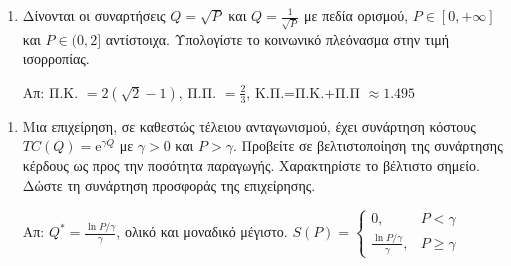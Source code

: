 \begin{center}
  \minibox{\large\bfseries \textcolor{Col1}{Πλεόνασμα Παραγωγού - Καταναλωτή}}
\end{center}

\begin{enumerate}
  \item Δίνονται οι συναρτήσεις $ Q = \sqrt{P} $ και $ Q = \frac{1}{\sqrt{P}} $ 
    με πεδία ορισμού, $ P \in [0, + \infty] $ και $ P \in (0,2] $ αντίστοιχα. 
    Υπολογίστε το κοινωνικό πλεόνασμα στην τιμή ισορροπίας.

    \hfill Απ: Π.Κ. $= 2(\sqrt{2} -1)$, Π.Π. $= \frac{2}{3} $, Κ.Π.=Π.Κ.+Π.Π $ \approx
    1.495 $ 
\end{enumerate}

\begin{center}
  \minibox{\large\bfseries \textcolor{Col1}{Ακρότατα}}
\end{center}

\begin{enumerate}
  \item Μια επιχείρηση, σε καθεστώς τέλειου ανταγωνισμού, έχει συνάρτηση κόστους 
    $ TC(Q)= \mathrm{e}^{\gamma Q} $ με $ \gamma > 0 $ και $ P > \gamma $. Προβείτε σε 
    βελτιστοποίηση της συνάρτησης κέρδους ως προς την ποσότητα παραγωγής. Χαρακτηρίστε το
    βέλτιστο σημείο. Δώστε τη συνάρτηση προσφοράς της επιχείρησης.

    \hfill Απ: $ Q^{*}= \frac{\ln{P/ \gamma}}{\gamma} $, ολικό και μοναδικό μέγιστο. 
    $ S(P)= 
     \begin{cases}
       0, & P< \gamma \\
       \frac{\ln{P/ \gamma}}{\gamma}, & P \geq \gamma
        \end{cases}$
\end{enumerate}


